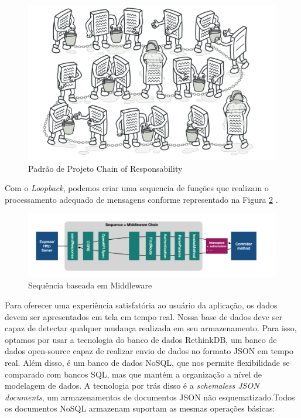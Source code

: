 \begin{figure}[!h]
	\centering
	\label{chain-of-responsibility}
		\includegraphics[keepaspectratio=true,scale=0.25]{figuras/chain-of-responsibility.png}
	\caption{Padrão de Projeto Chain of Responsability \cite{ChainFigura}}
	\label{fig:chain-of-responsibility}
\end{figure}

Com o \textit{Loopback}, podemos criar uma sequencia de funções que realizam o processamento adequado de mensagens conforme representado na Figura \ref{fig:middleware} \cite{Loopback}.

\begin{figure}[!h]
	\centering
	\label{middleware}
		\includegraphics[keepaspectratio=true,scale=0.9]{figuras/middleware.png}
	\caption{Sequência baseada em Middleware  \cite{Loopback}}
	\label{fig:middleware}
\end{figure}



Para oferecer uma experiência satisfatória ao usuário da aplicação, os dados devem ser apresentados em tela em tempo real. Nossa base de dados deve ser capaz de detectar qualquer mudança realizada em seu armazenamento. Para isso, optamos por usar a tecnologia do banco de dados RethinkDB, um banco de dados open-source capaz de realizar envio de dados no formato JSON em tempo real. 
Além disso, é um banco de dados NoSQL, que nos permite flexibilidade se comparado com bancos SQL, mas que mantém a organização a nível de modelagem de dados. A tecnologia por trás disso é a \textit{schemaless JSON documents}, um armazenamentos de documentos JSON não esquematizado.Todos os documentos NoSQL armazenam suportam as mesmas operações básicas:

